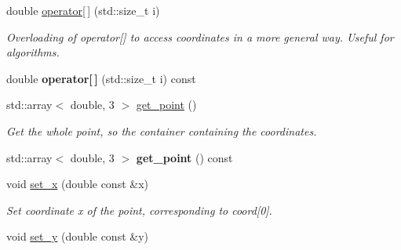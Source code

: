 \begin{DoxyCompactItemize}
\item 
\hypertarget{classpoint3D_a0b48bb211f8ac36fa73e31dd6dc059e8}{
double \hyperlink{classpoint3D_a0b48bb211f8ac36fa73e31dd6dc059e8}{operator\mbox{[}$\,$\mbox{]}} (std::size\_\-t i)}
\label{classpoint3D_a0b48bb211f8ac36fa73e31dd6dc059e8}

\begin{DoxyCompactList}\small\item\em Overloading of operator\mbox{[}\mbox{]} to access coordinates in a more general way. Useful for algorithms. \item\end{DoxyCompactList}\item 
\hypertarget{classpoint3D_aaf8bacd896c559c0643e9e40fca51216}{
double {\bfseries operator\mbox{[}$\,$\mbox{]}} (std::size\_\-t i) const }
\label{classpoint3D_aaf8bacd896c559c0643e9e40fca51216}

\item 
\hypertarget{classpoint3D_a34c1b06243e32fc31bc3ea8ffb6c32eb}{
std::array$<$ double, 3 $>$ \hyperlink{classpoint3D_a34c1b06243e32fc31bc3ea8ffb6c32eb}{get\_\-point} ()}
\label{classpoint3D_a34c1b06243e32fc31bc3ea8ffb6c32eb}

\begin{DoxyCompactList}\small\item\em Get the whole point, so the container containing the coordinates. \item\end{DoxyCompactList}\item 
\hypertarget{classpoint3D_ad2213593cf9545a1d3355b89553f443c}{
std::array$<$ double, 3 $>$ {\bfseries get\_\-point} () const }
\label{classpoint3D_ad2213593cf9545a1d3355b89553f443c}

\item 
\hypertarget{classpoint3D_a875f1e4e011faf3d0d759ece81456428}{
void \hyperlink{classpoint3D_a875f1e4e011faf3d0d759ece81456428}{set\_\-x} (double const \&x)}
\label{classpoint3D_a875f1e4e011faf3d0d759ece81456428}

\begin{DoxyCompactList}\small\item\em Set coordinate x of the point, corresponding to coord\mbox{[}0\mbox{]}. \item\end{DoxyCompactList}\item 
\hypertarget{classpoint3D_a128d6e5c8a68fa5c2602d2c713227c4b}{
void \hyperlink{classpoint3D_a128d6e5c8a68fa5c2602d2c713227c4b}{set\_\-y} (double const \&y)}
\label{classpoint3D_a128d6e5c8a68fa5c2602d2c713227c4b}


\end{DoxyCompactItemize}
